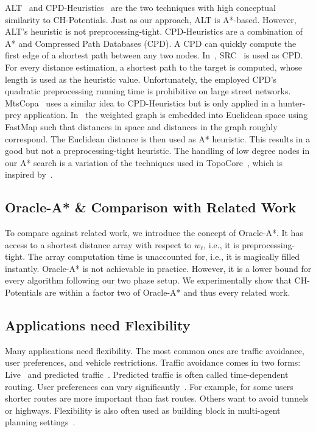 \documentclass[a4paper,USenglish,cleveref, autoref, thm-restate]{lipics-v2019}
\begin{document}
ALT~\cite{gh-cspas-05} and CPD-Heuristics~\cite{DBLP:conf/ijcai/BonoGHS19} are the two techniques with high conceptual similarity to CH-Potentials.
Just as our approach, ALT is A*-based.
However, ALT's heuristic is not preprocessing-tight.
%
CPD-Heuristics are a combination of A* and Compressed Path Databases (CPD).
A CPD can quickly compute the first edge of a shortest path between any two nodes.
In~\cite{DBLP:conf/ijcai/BonoGHS19}, SRC~\cite{DBLP:conf/socs/StrasserHB14} is used as CPD.
For every distance estimation, a shortest path to the target is computed, whose length is used as the heuristic value.
Unfortunately, the employed CPD's quadratic preprocessing running time is prohibitive on large street networks.
%
MtsCopa~\cite{DBLP:journals/tciaig/BaierBHH15} uses a similar idea to CPD-Heuristics but is only applied in a hunter-prey application.
%
In~\cite{DBLP:conf/ijcai/0002UJAKK18} the weighted graph is embedded into Euclidean space using FastMap such that distances in space and distances in the graph roughly correspond.
The Euclidean distance is then used as A* heuristic.
This results in a good but not a preprocessing-tight heuristic.
%
The handling of low degree nodes in our A* search is a variation of the techniques used in TopoCore~\cite{DBLP:conf/gis/DibbeltSW15}, which is inspired by~\cite{DBLP:journals/pvldb/FunkeNS14}.

\subsection{Oracle-A* \& Comparison with Related Work}
\label{sec:oracle}

To compare against related work, we introduce the concept of Oracle-A*.
It has access to a shortest distance array with respect to $w_\ell$, i.e., it is preprocessing-tight.
The array computation time is unaccounted for, i.e., it is magically filled instantly.
Oracle-A* is not achievable in practice.
However, it is a lower bound for every algorithm following our two phase setup.
We experimentally show that CH-Potentials are within a factor two of Oracle-A* and thus every related work.

\subsection{Applications need Flexibility}

Many applications need flexibility.
The most common ones are traffic avoidance, user preferences, and vehicle restrictions.
Traffic avoidance comes in two forms: Live~\cite{dgpw-crprn-13,dsw-cch-15} and predicted traffic~\cite{ndls-bastd-12,bgsv-mtdtt-13}.
Predicted traffic is often called time-dependent routing.
%
User preferences can vary significantly~\cite{DBLP:conf/gis/FunkeS15,DBLP:conf/gis/DellingGGKTW15,DBLP:conf/gis/FunkeLS16}.
For example, for some users shorter routes are more important than fast routes.
Others want to avoid tunnels or highways.
%
Flexibility is also often used as building block in multi-agent planning settings~\cite{DBLP:journals/ai/SharonSFS15,DBLP:journals/tciaig/BaierBHH15}.
%
\end{document}
